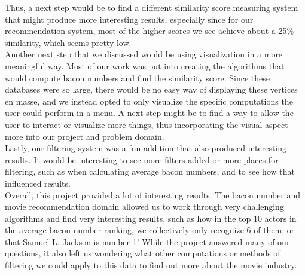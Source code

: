 \documentclass{article}
\begin{document}
Thus, a next step would be to find a different similarity score measuring system that might produce more interesting results, especially since for our recommendation system, most of the higher scores we see achieve about a 25\% similarity, which seems pretty low. \\

Another next step that we discussed would be using visualization in a more meaningful way. Most of our work was put into creating the algorithms that would compute bacon numbers and find the similarity score. Since these databases were so large, there would be no easy way of displaying these vertices en masse, and we instead opted to only visualize the specific computations the user could perform in a menu. A next step might be to find a way to allow the user to interact or visualize more things, thus incorporating the visual aspect more into our project and problem domain. \\

Lastly, our filtering system was a fun addition that also produced interesting results. It would be interesting to see more filters added or more places for filtering, such as when calculating average bacon numbers, and to see how that influenced results. \\

Overall, this project provided a lot of interesting results. The bacon number and movie recommendation domain allowed us to work through very challenging algorithms and find very interesting results, such as how in the top 10 actors in the average bacon number ranking, we collectively only recognize 6 of them, or that Samuel L. Jackson is number 1! While the project answered many of our questions, it also left us wondering what other computations or methods of filtering we could apply to this data to find out more about the movie industry. \\
\end{document}
